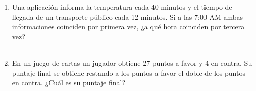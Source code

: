 \documentclass[11pt,letterpaper]{article}
\newenvironment{alternativas}{%
\begin{enumerate}[label=\Alph*), leftmargin=14pt, itemsep=2pt, topsep=2pt]
}{\end{enumerate}}
\begin{document}
\begin{enumerate}[label=\textbf{\arabic*.}, leftmargin=*, itemsep=7pt]
\item
\begin{minipage}[t]{\linewidth}
Una aplicación informa la temperatura cada 40 minutos y el tiempo de llegada de un transporte público cada 12 minutos. Si a las 7:00 AM ambas informaciones coinciden por primera vez, ¿a qué hora coinciden por tercera vez?\\
\\%
\begin{minipage}{\linewidth}
\vspace{7mm}
\end{minipage}
\vspace{7mm}
\end{minipage}

\item
\begin{minipage}[t]{\linewidth}
En un juego de cartas un jugador obtiene 27 puntos a favor y 4 en contra. Su puntaje final se obtiene restando a los puntos a favor el doble de los puntos en contra. ¿Cuál es su puntaje final?\\
\\%
\begin{minipage}{\linewidth}
\vspace{7mm}
\end{minipage}
\vspace{7mm}
\end{minipage}


\end{enumerate}
\end{document}
